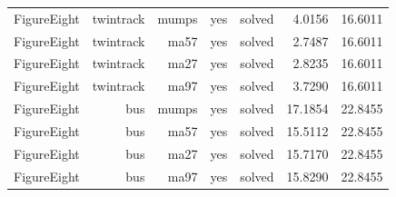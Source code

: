 {\begin{longtable}{|r|r|r|r|r|r|r|}
  FigureEight & twintrack & mumps & yes & solved & 4.0156 & 16.6011 \\
  FigureEight & twintrack & ma57 & yes & solved & 2.7487 & 16.6011 \\
  FigureEight & twintrack & ma27 & yes & solved & 2.8235 & 16.6011 \\
  FigureEight & twintrack & ma97 & yes & solved & 3.7290 & 16.6011 \\
  FigureEight & bus & mumps & yes & solved & 17.1854 & 22.8455 \\
  FigureEight & bus & ma57 & yes & solved & 15.5112 & 22.8455 \\
  FigureEight & bus & ma27 & yes & solved & 15.7170 & 22.8455 \\
  FigureEight & bus & ma97 & yes & solved & 15.8290 & 22.8455 \\
  \hline
\end{longtable}
}

